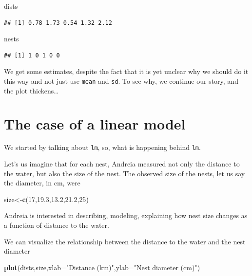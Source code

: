 \documentclass[
]{book}
\newenvironment{Shaded}{\begin{snugshade}}{\end{snugshade}}
\newcommand{\AttributeTok}[1]{\textcolor[rgb]{0.13,0.29,0.53}{#1}}
\newcommand{\DecValTok}[1]{\textcolor[rgb]{0.00,0.00,0.81}{#1}}
\newcommand{\FloatTok}[1]{\textcolor[rgb]{0.00,0.00,0.81}{#1}}
\newcommand{\FunctionTok}[1]{\textcolor[rgb]{0.13,0.29,0.53}{\textbf{#1}}}
\newcommand{\NormalTok}[1]{#1}
\newcommand{\OtherTok}[1]{\textcolor[rgb]{0.56,0.35,0.01}{#1}}
\newcommand{\StringTok}[1]{\textcolor[rgb]{0.31,0.60,0.02}{#1}}
\begin{document}
\begin{Shaded}
\begin{Highlighting}[]
\NormalTok{dists}
\end{Highlighting}
\end{Shaded}

\begin{verbatim}
## [1] 0.78 1.73 0.54 1.32 2.12
\end{verbatim}

\begin{Shaded}
\begin{Highlighting}[]
\NormalTok{nests}
\end{Highlighting}
\end{Shaded}

\begin{verbatim}
## [1] 1 0 1 0 0
\end{verbatim}

We get some estimates, despite the fact that it is yet unclear why we should do it this way and not just use \texttt{mean} and \texttt{sd}. To see why, we continue our story, and the plot thickens\ldots{}

\section{The case of a linear model}\label{the-case-of-a-linear-model}

We started by talking about \texttt{lm}, so, what is happening behind \texttt{lm}.

Let's us imagine that for each nest, Andreia measured not only the distance to the water, but also the size of the nest. The observed size of the nests, let us say the diameter, in cm, were

\begin{Shaded}
\begin{Highlighting}[]
\NormalTok{size}\OtherTok{\textless{}{-}}\FunctionTok{c}\NormalTok{(}\DecValTok{17}\NormalTok{,}\FloatTok{19.3}\NormalTok{,}\FloatTok{13.2}\NormalTok{,}\FloatTok{21.2}\NormalTok{,}\DecValTok{25}\NormalTok{)}
\end{Highlighting}
\end{Shaded}

Andreia is interested in describing, modeling, explaining how nest size changes as a function of distance to the water.

We can visualize the relationship between the distance to the water and the nest diameter

\begin{Shaded}
\begin{Highlighting}[]
\FunctionTok{plot}\NormalTok{(dists,size,}\AttributeTok{xlab=}\StringTok{"Distance (km)"}\NormalTok{,}\AttributeTok{ylab=}\StringTok{"Nest diameter (cm)"}\NormalTok{)}
\end{Highlighting}
\end{Shaded}
\end{document}
